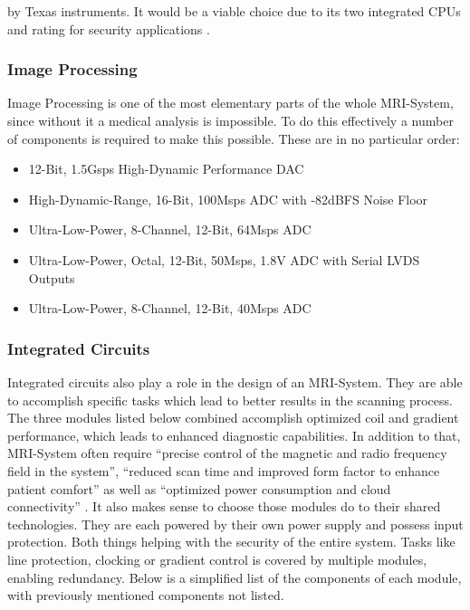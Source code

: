 \documentclass[conference]{IEEEtran}
\begin{document}
        by Texas instruments. It would be a viable choice due to its two integrated CPUs and rating for security applications \cite{fmrib}.
          
    
    
    \subsubsection{Image Processing}
    
        Image Processing is one of the most elementary parts of the whole MRI-System, since without it a medical analysis is impossible. To do this effectively a number of components is required to make this possible. These are in no particular order:
        
        \begin{itemize}
            \item 12-Bit, 1.5Gsps High-Dynamic Performance DAC \cite{MAX19681}
            \item High-Dynamic-Range, 16-Bit, 100Msps ADC with -82dBFS Noise Floor \cite{MAX19588}
            \item Ultra-Low-Power, 8-Channel, 12-Bit, 64Msps ADC \cite{MAX19528}
            \item Ultra-Low-Power, Octal, 12-Bit, 50Msps, 1.8V ADC with Serial LVDS Outputs \cite{MAX19527}
            \item Ultra-Low-Power, 8-Channel, 12-Bit, 40Msps ADC \cite{MAX19526}
        \end{itemize}    

    \subsubsection{Integrated Circuits}      

        Integrated circuits also play a role in the design of an MRI-System. They are able to accomplish specific tasks which lead to better results in the scanning process. The three modules listed below combined accomplish optimized coil and gradient performance, which leads to enhanced diagnostic capabilities.
        In addition to that, MRI-System often require “precise control of the magnetic and radio frequency field in the system”, “reduced scan time and improved form factor to enhance patient comfort” as well as “optimized power consumption and cloud connectivity” \cite{RFRM}\cite{RFPAM}\cite{RFSSM}.
        It also makes sense to choose those modules do to their shared technologies. They are each powered by their own power supply and possess input protection. Both things helping with the security of the entire system. Tasks like line protection, clocking or gradient control is covered by multiple modules, enabling redundancy. Below is a simplified list of the components of each module, with previously mentioned components not listed.
        
\end{document}
